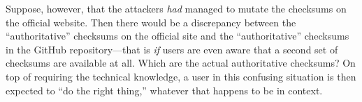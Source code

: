 Suppose, however, that the attackers \textit{had} managed to mutate the
checksums on the official website. Then there would be a discrepancy between the
``authoritative'' checksums on the official site and the ``authoritative''
checksums in the GitHub repository---that is \emph{if} users are even aware that
a second set of checksums are available at all. Which are the actual
authoritative checksums? On top of requiring the technical knowledge, a user in
this confusing situation is then expected to ``do the right thing,'' whatever
that happens to be in context.

